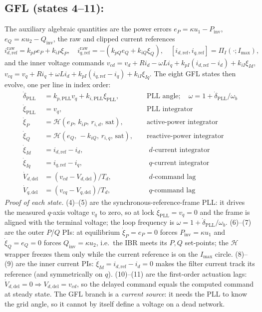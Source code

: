\documentclass[12pt,a4paper]{article}
\begin{document}
\subsection{GFL (states 4--11):}
The auxiliary algebraic quantities are the power errors
$e_P=\kappa u_1-P_{\mathrm{inv}}$, $e_Q=\kappa u_2-Q_{\mathrm{inv}}$, the raw and
clipped current references
\begin{equation}
  i_{d,\mathrm{ref}}^{\mathrm{raw}}=k_{pP}e_P+k_{iP}\xi_P,\quad
  i_{q,\mathrm{ref}}^{\mathrm{raw}}=-(k_{pQ}e_Q+k_{iQ}\xi_Q),\quad
  [i_{d,\mathrm{ref}},i_{q,\mathrm{ref}}]=\Pi_I(\cdot;I_{\max}),
\end{equation}
and the inner voltage commands
$v_{cd}=v_d+R i_d-\omega L i_q+k_{pI}(i_{d,\mathrm{ref}}-i_d)+k_{iI}\xi_{Id}$,
$v_{cq}=v_q+R i_q+\omega L i_d+k_{pI}(i_{q,\mathrm{ref}}-i_q)+k_{iI}\xi_{Iq}$.
The eight GFL states then evolve, one per line in index order:
\begin{align}
  \dot{\delta}_{\mathrm{PLL}} &= k_{p,\mathrm{PLL}}v_q+k_{i,\mathrm{PLL}}\xi_{\mathrm{PLL}},
     &&\text{ PLL angle};\quad \omega=1+\dot\delta_{\mathrm{PLL}}/\omega_b\\
  \dot{\xi}_{\mathrm{PLL}} &= v_q, &&\text{ PLL integrator}\\
  \dot{\xi}_P &= \mathcal{H}(e_P,\,k_{iP},\,r_{i,d},\,\text{sat}),
     &&\text{ active-power integrator}\\
  \dot{\xi}_Q &= \mathcal{H}(e_Q,\,-k_{iQ},\,r_{i,q},\,\text{sat}),
     &&\text{ reactive-power integrator}\\
  \dot{\xi}_{Id} &= i_{d,\mathrm{ref}}-i_d, &&\text{ $d$-current integrator}\\
  \dot{\xi}_{Iq} &= i_{q,\mathrm{ref}}-i_q, &&\text{ $q$-current integrator}\\
  \dot{V}_{d,\mathrm{del}} &= (v_{cd}-V_{d,\mathrm{del}})/T_d, &&\text{ $d$-command lag}\\
  \dot{V}_{q,\mathrm{del}} &= (v_{cq}-V_{q,\mathrm{del}})/T_d, &&\text{ $q$-command lag}
\end{align}
\emph{Proof of each state.} (4)--(5) are the synchronous-reference-frame PLL: it
drives the measured $q$-axis voltage $v_q$ to zero, so at lock $\dot\xi_{\mathrm{PLL}}
=v_q=0$ and the frame is aligned with the terminal voltage; the loop frequency is
$\omega=1+\dot\delta_{\mathrm{PLL}}/\omega_b$. (6)--(7) are the outer $P$/$Q$ PIs:
at equilibrium $\dot\xi_P=e_P=0$ forces $P_{\mathrm{inv}}=\kappa u_1$ and
$\dot\xi_Q=e_Q=0$ forces $Q_{\mathrm{inv}}=\kappa u_2$, i.e.\ the IBR meets its
$P,Q$ set-points; the $\mathcal H$ wrapper freezes them only while the current
reference is on the $I_{\max}$ circle. (8)--(9) are the inner current PIs:
$\dot\xi_{Id}=i_{d,\mathrm{ref}}-i_d=0$ makes the filter current track its
reference (and symmetrically on $q$). (10)--(11) are the first-order actuation
lags: $\dot V_{d,\mathrm{del}}=0\Rightarrow V_{d,\mathrm{del}}=v_{cd}$, so the
delayed command equals the computed command at steady state. The GFL branch is a
\emph{current source}: it needs the PLL to know the grid angle, so it cannot by
itself define a voltage on a dead network.
\end{document}
